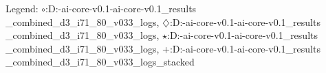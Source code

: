 Legend: {\color{CornflowerBlue}$\circ$}:D:\engineering-ai-core-v0.1\engineering-ai-core-v0.1\exdata\validation\_results\\_combined\_d3\_i71\_80\_v033\coco\_logs\cmaes, {{}$\diamondsuit$}:D:\engineering-ai-core-v0.1\engineering-ai-core-v0.1\exdata\validation\_results\\_combined\_d3\_i71\_80\_v033\coco\_logs\ngopt, {\color{Green}$\star$}:D:\engineering-ai-core-v0.1\engineering-ai-core-v0.1\exdata\validation\_results\\_combined\_d3\_i71\_80\_v033\coco\_logs\stacked, {\color{red}+}:D:\engineering-ai-core-v0.1\engineering-ai-core-v0.1\exdata\validation\_results\\_combined\_d3\_i71\_80\_v033\coco\_logs\adaptive\_stacked